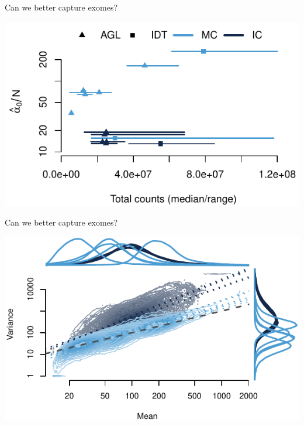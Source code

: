 \documentclass[
  10pt,
  ignorenonframetext,
  m]{beamer}
\begin{document}
\begin{frame}{Can we better capture exomes?}
\protect\hypertarget{can-we-better-capture-exomes-2}{}

\begin{center}\includegraphics{defense_files/figure-beamer/a0plt-1} \end{center}

\end{frame}

\begin{frame}{Can we better capture exomes?}
\protect\hypertarget{can-we-better-capture-exomes-3}{}

\begin{center}\includegraphics{defense_files/figure-beamer/aglMnVr-1} \end{center}

\end{frame}
\end{document}
